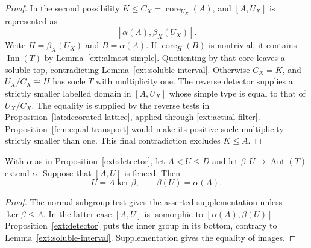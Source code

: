 \begin{proof}
In the second possibility $K\le C_X=\operatorname{core}_{U_X}(A)$,
and $[A,U_X]$ is represented as
\[
             [\alpha(A),\beta_X(U_X)].
\]
Write $H=\beta_X(U_X)$ and $B=\alpha(A)$.  If
$\operatorname{core}_H(B)$ is nontrivial, it contains
$\operatorname{Inn}(T)$ by Lemma~\ref{ext:almost-simple}.  Quotienting
by that core leaves a soluble top, contradicting
Lemma~\ref{ext:soluble-interval}.
Otherwise $C_X=K$, and $U_X/C_X\cong H$ has socle $T$ with multiplicity
one.  The reverse detector supplies a strictly smaller labelled domain
in $[A,U_X]$ whose simple type is equal to that of $U_X/C_X$.
The equality is supplied by the reverse tests in
Proposition~\ref{lat:decorated-lattice}, applied through
\eqref{ext:actual-filter}.  Proposition~\ref{frm:equal-transport} would make
its positive socle multiplicity strictly smaller than one.  This final
contradiction excludes $K\le A$.
\end{proof}

\begin{lemma}\label{ext:constant-image}
With $\alpha$ as in Proposition~\ref{ext:detector}, let $A<U\le D$ and
let $\beta:U\to\operatorname{Aut}(T)$ extend $\alpha$.
Suppose that $[A,U]$ is fenced.  Then
\[
                  U=A\ker\beta,
       \qquad \beta(U)=\alpha(A).
\]
\end{lemma}
\begin{proof}
The normal-subgroup test gives the asserted supplementation unless
$\ker\beta\le A$.  In the latter case $[A,U]$ is isomorphic to
$[\alpha(A),\beta(U)]$.  Proposition~\ref{ext:detector} puts the inner
group in its bottom, contrary to Lemma~\ref{ext:soluble-interval}.
Supplementation gives the equality of images.
\end{proof}

